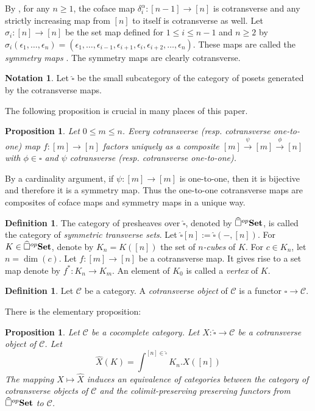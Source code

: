 \documentclass[a4paper,12pt]{amsart}
\newcommand{\C}{\mathcal{C}}
\newtheorem{prop}[thm]{Proposition}
\newcommand{\bp}{\begin{prop}}
\newcommand{\ep}{\end{prop}}
\theoremstyle{definition}
\newtheorem{defn}[thm]{Definition}
\newcommand{\bd}{\begin{defn}}
\newcommand{\ed}{\end{defn}}
\newtheorem{nota}[thm]{Notation}
\renewcommand{\leq}{\leqslant}
\renewcommand{\geq}{\geqslant}
\newcommand{\brm}[1]{{\rm{\mathbf{#1}}}}
\newcommand{\set}{{\brm{Set}}}
\begin{document}
By \cite[Proposition~2.1.6]{symcub}, for any $n\geq 1$, the coface map $\delta_i^\alpha : [n-1] \rightarrow [n]$ is cotransverse and any strictly increasing map from $[n]$ to itself is cotransverse as well. Let $\sigma_i:[n] \rightarrow [n]$ be the set map defined for $1\leq i\leq n-1$ and $n\geq 2$ by $\sigma_i(\epsilon_1, \dots, \epsilon_{n}) = (\epsilon_1, \dots, \epsilon_{i-1},\epsilon_{i+1},\epsilon_{i}, \epsilon_{i+2},\dots,\epsilon_{n})$. These maps are called the \textit{symmetry maps} \cite{MR1988396}. The symmetry maps are clearly cotransverse.


\begin{nota}
	Let $\widehat{\square}$ be the small subcategory of the category of posets generated by the cotransverse maps.
\end{nota}

The following proposition is crucial in many places of this paper.

\bp \cite[Proposition~3.1.14]{symcub} \label{decomposition_distance} Let $0\leq m\leq n$. Every cotransverse (resp. cotransverse one-to-one) map $f:[m] \rightarrow [n]$ factors uniquely as a composite $[m] \stackrel{\psi}\longrightarrow [m] \stackrel{\phi}\longrightarrow [n]$ with $\phi\in \square$ and $\psi$ cotransverse (resp. cotransverse one-to-one).  \ep


By a cardinality argument, if $\psi:[m] \rightarrow [m]$ is one-to-one, then it is bijective and therefore it is a symmetry map. Thus the one-to-one cotransverse maps are composites of coface maps and symmetry maps in a unique way. 

\bd \cite[Definition~2.1.13]{symcub} The category of presheaves over $\widehat{\square}$, denoted by $\widehat{\square}^{op}\set$, is called the category of \textit{symmetric transverse sets}. Let $\widehat{\square}[n]:=\widehat{\square}(-,[n])$. For $K\in \widehat{\square}^{op}\set$, denote by  $K_n=K([n])$ the set of \textit{$n$-cubes} of $K$.  For $c\in K_n$, let $n=\dim(c)$. Let $f:[m]\to [n]$ be a cotransverse map. It gives rise to a set map denote by $f^*:K_n\to K_m$. An element of $K_0$ is called a \textit{vertex} of $K$.
\ed


\bd Let $\C$ be a category. A \textit{cotransverse object} of $\C$ is a functor $\widehat{\square}\to \C$.
\ed

There is the elementary proposition: 

\bp \label{eq-cat}
Let $\C$ be a cocomplete category. Let $X:\widehat{\square}\to \C$ be a cotransverse object of $\C$. Let \[\widehat{X}(K)=\int^{[n]\in\widehat{\square}} K_n.X([n])\] The mapping $X\mapsto \widehat{X}$ induces an equivalence of categories between the category of cotransverse objects of $\C$ and the colimit-preserving preserving functors from $\widehat{\square}^{op}\set$ to $\C$.
\ep
\end{document}
